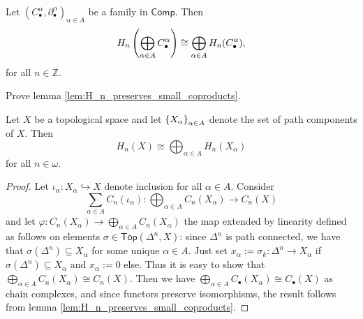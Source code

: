 \begin{lemma}
	\label{lem:H_n_preserves_small_coproducts}
	Let $(C_\bullet^\alpha,\partial_\bullet^\alpha)_{\alpha \in A}$ be a family in $\mathsf{Comp}$. Then
	\begin{equation*}
		H_n\del[4]{\bigoplus_{\alpha \in A}C_\bullet^\alpha} \cong \bigoplus_{\alpha \in A}H_n(C_\bullet^\alpha),
	\end{equation*}
	\noindent for all $n \in \mathbb{Z}$.
\end{lemma}

\begin{exercise}
	Prove lemma \ref{lem:H_n_preserves_small_coproducts}.
\end{exercise}

\begin{lemma}
	\label{lem:H_n_direct_sum}
	Let $X$ be a topological space and let $\cbr{X_\alpha}_{\alpha \in A}$ denote the set of path components of $X$. Then
\begin{equation*}
	H_n(X) \cong \bigoplus_{\alpha \in A}H_n(X_\alpha)
\end{equation*}
\noindent for all $n \in \omega$.
\end{lemma}

\begin{proof}
	Let $\iota_\alpha : X_\alpha \hookrightarrow X$ denote inclusion for all $\alpha \in A$. Consider 
	\begin{equation*}
		\sum_{\alpha \in A}C_n(\iota_\alpha) : \bigoplus_{\alpha \in A} C_n(X_\alpha) \to C_n(X)
	\end{equation*}
	\noindent and let $\varphi : C_n(X_\alpha) \to \bigoplus_{\alpha \in A}C_n(X_\alpha)$ the map extended by linearity defined as follows on elements $\sigma \in \mathsf{Top}(\Delta^n,X)$: since $\Delta^n$ is path connected, we have that $\sigma(\Delta^n) \subseteq X_\alpha$ for some unique $\alpha \in A$. Just set $x_\alpha := \sigma_k : \Delta^n \to X_\alpha$ if $\sigma(\Delta^n) \subseteq X_\alpha$ and $x_\alpha := 0$ else. Thus it is easy to show that $\bigoplus_{\alpha \in A}C_n(X_\alpha) \cong C_n(X)$. Then we have $\bigoplus_{\alpha \in A}C_\bullet(X_\alpha) \cong C_\bullet(X)$ as chain complexes, and since functors preserve isomorphisms, the result follows from lemma \ref{lem:H_n_preserves_small_coproducts}.
\end{proof}

